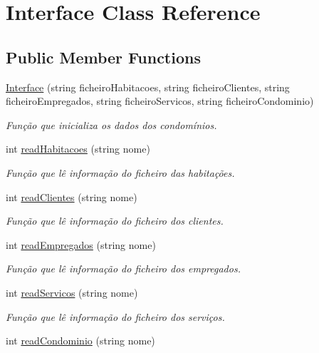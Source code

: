 \hypertarget{class_interface}{}\section{Interface Class Reference}
\label{class_interface}
\subsection*{Public Member Functions}
\begin{DoxyCompactItemize}
\item 
\hyperlink{class_interface_a4c177919e79ec95562a389e522f4600e}{Interface} (string ficheiro\+Habitacoes, string ficheiro\+Clientes, string ficheiro\+Empregados, string ficheiro\+Servicos, string ficheiro\+Condominio)
\begin{DoxyCompactList}\small\item\em Função que inicializa os dados dos condomínios. \end{DoxyCompactList}\item 
int \hyperlink{class_interface_a3c605f4160106a724be0fce9efe3bc92}{read\+Habitacoes} (string nome)
\begin{DoxyCompactList}\small\item\em Função que lê informação do ficheiro das habitações. \end{DoxyCompactList}\item 
int \hyperlink{class_interface_acd189be806d0b10c88172c9ef7690516}{read\+Clientes} (string nome)
\begin{DoxyCompactList}\small\item\em Função que lê informação do ficheiro dos clientes. \end{DoxyCompactList}\item 
int \hyperlink{class_interface_ad9610b10ebc19be8d43d9e3fcf73cb13}{read\+Empregados} (string nome)
\begin{DoxyCompactList}\small\item\em Função que lê informação do ficheiro dos empregados. \end{DoxyCompactList}\item 
int \hyperlink{class_interface_ad59e6bc08a709c085139c660bbb90429}{read\+Servicos} (string nome)
\begin{DoxyCompactList}\small\item\em Função que lê informação do ficheiro dos serviços. \end{DoxyCompactList}\item 
int \hyperlink{class_interface_a33674b11f816b6614f9e5c69d346c706}{read\+Condominio} (string nome)

\end{DoxyCompactItemize}
